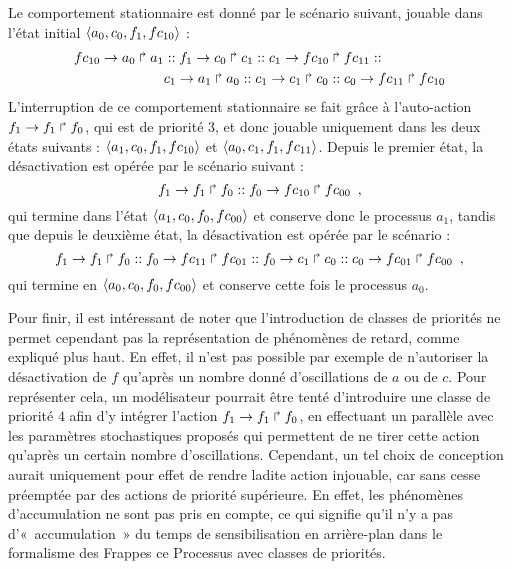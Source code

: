 \begin{example}
  Le comportement stationnaire est donné par le scénario suivant,
  jouable dans l'état initial $\mbox{$\langle a_0, c_0, f_1, fc_{10} \rangle$}$ :
  \begin{align*}
    fc_{10}\rightarrow a_0\Rsh a_1 &::
    f_1\rightarrow c_0\Rsh c_1 ::
    c_1\rightarrow fc_{10}\Rsh fc_{11} :: \\
    &c_1\rightarrow a_1\Rsh a_0 ::
    c_1\rightarrow c_1\Rsh c_0 ::
    c_0\rightarrow fc_{11}\Rsh fc_{10}
  \end{align*}
  L'interruption de ce comportement stationnaire se fait grâce à l'auto-action
  $f_1\rightarrow f_1\Rsh f_0$, qui est de priorité 3, et donc jouable uniquement
  dans les deux états suivants :
  $\mbox{$\langle a_1, c_0, f_1, fc_{10} \rangle$}$ et $\mbox{$\langle a_0, c_1, f_1, fc_{11} \rangle$}$.
  Depuis le premier état, la désactivation est opérée par le scénario suivant :
  \[
    f_1\rightarrow f_1\Rsh f_0 ::
    f_0\rightarrow fc_{10}\Rsh fc_{00}
    \enspace,
  \]
  qui termine dans l'état $\mbox{$\langle a_1, c_0, f_0, fc_{00} \rangle$}$ et conserve donc le processus $a_1$,
  tandis que depuis le deuxième état, la désactivation est opérée par le scénario :
  \[
    f_1\rightarrow f_1\Rsh f_0 ::
    f_0\rightarrow fc_{11}\Rsh fc_{01} ::
    f_0\rightarrow c_1\Rsh c_0 ::
    c_0\rightarrow fc_{01}\Rsh fc_{00}
    \enspace,
  \]
  qui termine en $\mbox{$\langle a_0, c_0, f_0, fc_{00} \rangle$}$ et conserve cette fois le processus $a_0$.
  
  Pour finir, il est intéressant de noter que l'introduction de classes de priorités ne permet
  cependant pas la représentation de phénomènes de retard, comme expliqué plus haut.
  En effet, il n'est pas possible par exemple de n'autoriser la désactivation de $f$
  qu'après un nombre donné d'oscillations de $a$ ou de $c$.
  Pour représenter cela, un modélisateur pourrait être tenté d'introduire une classe de
  priorité $4$ afin d'y intégrer l'action $f_1\rightarrow f_1\Rsh f_0$,
  en effectuant un parallèle avec les paramètres stochastiques proposés \toref
  qui permettent de ne tirer cette action qu'après un certain nombre d'oscillations.
  Cependant, un tel choix de conception aurait uniquement pour effet de rendre ladite action
  injouable, car sans cesse préemptée par des actions de priorité supérieure.
  En effet, les phénomènes d'accumulation ne sont pas pris en compte,
  ce qui signifie qu'il n'y a pas d'«~accumulation~» du temps de sensibilisation en arrière-plan
  dans le formalisme des Frappes ce Processus avec classes de priorités.
  

\end{example}
